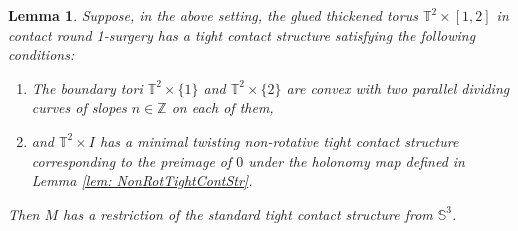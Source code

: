 \documentclass{amsart}
\theoremstyle{plain}
\newtheorem{lem}{Lemma}
\theoremstyle{remark}
\theoremstyle{definition}
\newcommand{\s}{\mathbb{S}}
\begin{document}
\begin{lem}\label{lem: ResOfStdTightCont}
    Suppose, in the above setting, the glued thickened torus $\mathbb{T}^2 \times [1,2]$ in contact round 1-surgery has a tight contact structure satisfying the following conditions:  
    \begin{enumerate}
        \item The boundary tori $\mathbb{T}^2 \times \{1\}$ and $\mathbb{T}^2 \times \{2\}$ are convex with two parallel dividing curves of slopes $n\in \mathbb{Z}$ on each of them,
        \item and $\mathbb{T}^2 \times I$ has a minimal twisting non-rotative tight contact structure corresponding to the preimage of $0$ under the holonomy map defined in Lemma \ref{lem: NonRotTightContStr}.  
    \end{enumerate}
    Then $M $ has a restriction of the standard tight contact structure from $\s^3$. 
\end{lem}
\end{document}
